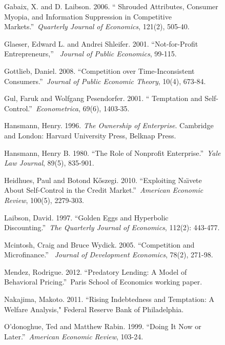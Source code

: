 \documentclass[11pt]{article}%
\begin{document}
\begin{figure}
{\begin{thebibliography}{99}
Gabaix, X. and D. Laibson. 2006. \textquotedblleft
Shrouded Attributes, Consumer Myopia, and Information Suppression in
Competitive Markets.\textquotedblright\ \textit{Quarterly Journal of
Economics}, 121(2), 505-40.

Glaeser, Edward L. and Andrei Shleifer. 2001.
\textquotedblleft Not-for-Profit Entrepreneurs,\textquotedblright%
\ \textit{Journal of Public Economics}, 99-115.

Gottlieb, Daniel. 2008. \textquotedblleft Competition
over Time-Inconsistent Consumers.\textquotedblright\ \textit{Journal of Public
Economic Theory}, 10(4), 673-84.

\bibitem {}Gul, Faruk and Wolfgang Pesendorfer. 2001. \textquotedblleft
Temptation and Self-Control.\textquotedblright\ \textit{Econometrica}, 69(6), 1403-35.

\bibitem {}Hansmann, Henry. 1996. \emph{The Ownership of Enterprise}.
Cambridge and London: Harvard University Press, Belknap Press.

\bibitem {}Hansmann, Henry B. 1980. \textquotedblleft The Role of Nonprofit
Enterprise.\textquotedblright\ \textit{Yale Law Journal}, 89(5), 835-901.

Heidhues, Paul and Botond K\H{o}szegi. 2010.
\textquotedblleft Exploiting Na\"{\i}vete About Self-Control in the Credit
Market.\textquotedblright\ \textit{American Economic Review}, 100(5), 2279-303.

Laibson, David. 1997. \textquotedblleft Golden Eggs and
Hyperbolic Discounting.\textquotedblright\ \textit{The Quarterly Journal of
Economics}, 112(2): 443-477.

Mcintosh, Craig and Bruce Wydick. 2005.
\textquotedblleft Competition and Microfinance.\textquotedblright%
\ \textit{Journal of Development Economics}, 78(2), 271-98.

Mendez, Rodrigue. 2012. \textquotedblleft Predatory
Lending: A Model of Behavioral Pricing.\textquotedblright\ Paris School of
Economics working paper.

Nakajima, Makoto. 2011. \textquotedblleft Rising
Indebtedness and Temptation: A Welfare Analysis," Federal Reserve Bank of Philadelphia.

O'donoghue, Ted and Matthew Rabin. 1999.
\textquotedblleft Doing It Now or Later.\textquotedblright\ \textit{American
Economic Review}, 103-24.


\end{thebibliography}}
\end{figure}
\end{document}
